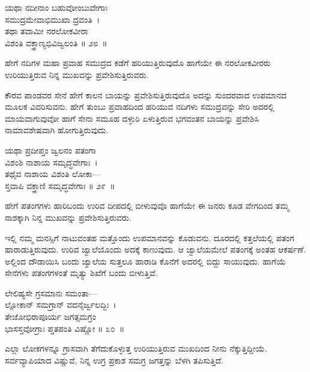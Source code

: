 \begin{shloka}
ಯಥಾ ನದೀನಾಂ ಬಹುವೋಂಬುವೇಗಾಃ \\ ಸಮುದ್ರಮೇವಾಭಿಮುಖಾ ದ್ರವಂತಿ~।\\ತಥಾ ತವಾಮೀ ನರಲೋಕವೀರಾ \\ ವಿಶಂತಿ ವಕ್ತ್ರಾಣ್ಯಭಿವಿಜ್ವಲಂತಿ \hfill॥ ೨೮~॥
\end{shloka}

\begin{artha}
ಹೇಗೆ ನದಿಗಳ ಮಹಾ ಪ್ರವಾಹ ಸಮುದ್ರದ ಕಡೆಗೆ ಹರಿಯುತ್ತಿರುವುದೊ ಹಾಗೆಯೇ ಈ ನರಲೋಕ\-ವೀರರು ಉರಿಯುತ್ತಿರುವ ನಿನ್ನ ಮುಖವನ್ನು ಪ್ರವೇಶಿಸುತ್ತಿರುವರು.
\end{artha}

ಕೌರವ ಪಾಂಡವರ ಸೇನೆ ಹೇಗೆ ಕಾಲನ ಬಾಯನ್ನು ಪ್ರವೇಶಿಸುತ್ತಿರುವುದೊ ಅದನ್ನು ಸುಂದರವಾದ ಉಪಮಾನದ ಮೂಲಕ ವಿವರಿಸುವನು. ಹೇಗೆ ತುಂಬು ಪ್ರವಾಹದಿಂದ ಹರಿಯುವ ನದಿಗಳು ಸಮುದ್ರವನ್ನು ಸೇರಿ ಅದರಲ್ಲಿ ಮಾಯವಾಗುವುವೋ ಹಾಗೆ ಸೇನಾ ಸಮೂಹ ದಳ್ಳುರಿ ಏಳುತ್ತಿರುವ ಭಗವಂತನ ಬಾಯನ್ನು ಪ್ರವೇಶಿಸಿ ನಾಮಾವಶೇಷವಾಗಿ ಹೋಗುತ್ತಿರುವುದು.

\begin{shloka}
ಯಥಾ ಪ್ರದೀಪ್ತಂ ಜ್ವಲನಂ ಪತಂಗಾ \\ ವಿಶಂಶಿ ನಾಶಾಯ ಸಮೃದ್ಧವೇಗಾಃ~।\\ತಥೈವ ನಾಶಾಯ ವಿಶಂತಿ ಲೋಕಾ—\\ ಸ್ತವಾಪಿ ವಕ್ತ್ರಾಣಿ ಸಮೃದ್ಧವೇಗಾಃ \hfill॥ ೨೯~॥
\end{shloka}

\begin{artha}
ಹೇಗೆ ಪತಂಗಗಳು ಹಾರಿಬಂದು ಉರಿವ ದೀಪದಲ್ಲಿ ಬೀಳುವುವೊ ಹಾಗೆಯೇ ಈ ಜನರು ಕೂಡ ವೇಗದಿಂದ ತಮ್ಮ ನಾಶಕ್ಕಾಗಿ ನಿನ್ನ ಮುಖವನ್ನು ಪ್ರವೇಶಿಸುತ್ತಿರುವರು.
\end{artha}

ಇಲ್ಲಿ ನಮ್ಮ ಮನಸ್ಸಿಗೆ ನಾಟುವಂತಹ ಮತ್ತೊಂದು ಉಪಮಾನವನ್ನು ಕೊಡುವನು. ದೂರದಲ್ಲಿ ಕತ್ತಲೆಯಲ್ಲಿ ಪತಂಗ ಹಾರಾಡುತ್ತಿರುವುದು. ಉರಿವ ಜ್ವಾಲೆಯೊಂದು ಅದಕ್ಕೆ ಕಾಣುವುದು. ಆ ಜ್ವಾಲೆಯಮೇಲೆ ಪತಂಗಕ್ಕೆ ಅಂತಹ ಆಕರ್ಷಣೆ. ಅಲ್ಲಿಂದ ದೌಡಾಯಿಸಿ ಬಂದು ಜ್ವಾಲೆಯ ಸುತ್ತಲೂ ಹಾರಾಡಿ ಕೊನೆಗೆ ಅದರಲ್ಲಿ ಬಿದ್ದು ಸಾಯುವುದು. ಹಾಗೆಯೆ ಸೇನೆಗಳು ಪತಂಗಗಳಂತೆ ಮೃತ್ಯು ಶಿಖೆಗೆ ಬಂದು ಬೀಳುತ್ತಿವೆ.

\begin{shloka}
ಲೇಲಿಹ್ಯಸೇ ಗ್ರಸಮಾನಃ ಸಮಂತಾ—\\ ಲ್ಲೋಕಾನ್ ಸಮಗ್ರಾನ್ ವದನೈರ್ಜ್ವಲದ್ಭಿಃ~।\\ತೇಜೋಭಿರಾಪೂರ್ಯ ಜಗತ್ಸಮಗ್ರಂ \\ ಭಾಸಸ್ತವೋಗ್ರಾಃ ಪ್ತತಪಂತಿ ವಿಷ್ಣೋ \hfill॥ ೩೦~॥
\end{shloka}

\begin{artha}
ಎಲ್ಲಾ ಲೋಕಗಳನ್ನೂ ಗ್ರಾಸವಾಗಿ ತೆಗೆದುಕೊಳ್ಳುತ್ತ ಉರಿಯುತ್ತಿರುವ ಮುಖದಿಂದ ನೀನು ನೆಕ್ಕುತ್ತಿ\-ದ್ದೀಯೆ. ಸರ್ವವ್ಯಾಪಿಯಾದ ವಿಷ್ಣುವೆ, ನಿನ್ನ ಉಗ್ರ ಪ್ರಕಾಶ ಸಮಗ್ರ ಜಗತ್ತನ್ನು ಬೆಳಗಿ ತಪಿಸುತ್ತಿದೆ.
\end{artha}

